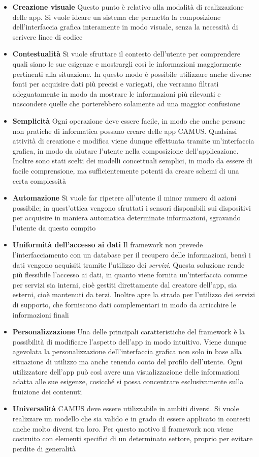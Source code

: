 \begin{itemize}
	\item \textbf{Creazione visuale} Questo punto è relativo alla modalità di realizzazione delle app. Si vuole ideare un sistema che permetta la composizione dell'interfaccia grafica interamente in modo visuale, senza la necessità di scrivere linee di codice
	\item \textbf{Contestualità} Si vuole sfruttare il contesto dell'utente per comprendere quali siano le sue esigenze e mostrargli così le informazioni maggiormente pertinenti alla situazione. In questo modo è possibile utilizzare anche diverse fonti per acquisire dati più precisi e variegati, che verranno filtrati adeguatamente in modo da mostrare le informazioni più rilevanti e nascondere quelle che porterebbero solamente ad una maggior confusione
	\item \textbf{Semplicità} Ogni operazione deve essere facile, in modo che anche persone non pratiche di informatica possano creare delle app CAMUS. Qualsiasi attività di creazione e modifica viene dunque effettuata tramite un'interfaccia grafica, in modo da aiutare l'utente nella composizione dell'applicazione. Inoltre sono stati scelti dei modelli concettuali semplici, in modo da essere di facile comprensione, ma sufficientemente potenti da creare schemi di una certa complessità
	\item \textbf{Automazione} Si vuole far ripetere all'utente il minor numero di azioni possibile; in quest'ottica vengono sfruttati i sensori disponibili sui dispositivi per acquisire in maniera automatica determinate informazioni, sgravando l'utente da questo compito
	\item \textbf{Uniformità dell'accesso ai dati} Il framework non prevede l'interfacciamento con un database per il recupero delle informazioni, bensì i dati vengono acquisiti tramite l'utilizzo dei \emph{servizi}. Questa soluzione rende più flessibile l'accesso ai dati, in quanto viene fornita un'interfaccia comune per servizi sia interni, cioè gestiti direttamente dal creatore dell'app, sia esterni, cioè mantenuti da terzi. Inoltre apre la strada per l'utilizzo dei servizi di supporto, che forniscono dati complementari in modo da arricchire le informazioni finali
	\item \textbf{Personalizzazione} Una delle principali caratteristiche del framework è la possibilità di modificare l'aspetto dell'app in modo intuitivo. Viene dunque agevolata la personalizzazione dell'interfaccia grafica non solo in base alla situazione di utilizzo ma anche tenendo conto del profilo dell'utente. Ogni utilizzatore dell'app può così avere una visualizzazione delle informazioni adatta alle sue esigenze, cosicché si possa concentrare esclusivamente sulla fruizione dei contenuti
	\item \textbf{Universalità} CAMUS deve essere utilizzabile in ambiti diversi. Si vuole realizzare un modello che sia valido e in grado di essere applicato in contesti anche molto diversi tra loro. Per questo motivo il framework non viene costruito con elementi specifici di un determinato settore, proprio per evitare perdite di generalità
\end{itemize}

